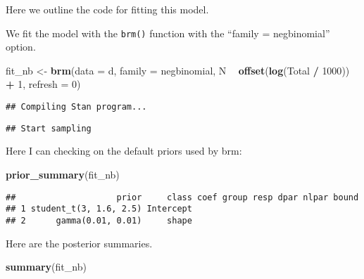 \documentclass[
]{book}
\newenvironment{Shaded}{\begin{snugshade}}{\end{snugshade}}
\newcommand{\DataTypeTok}[1]{\textcolor[rgb]{0.13,0.29,0.53}{#1}}
\newcommand{\DecValTok}[1]{\textcolor[rgb]{0.00,0.00,0.81}{#1}}
\newcommand{\KeywordTok}[1]{\textcolor[rgb]{0.13,0.29,0.53}{\textbf{#1}}}
\newcommand{\NormalTok}[1]{#1}
\newcommand{\OperatorTok}[1]{\textcolor[rgb]{0.81,0.36,0.00}{\textbf{#1}}}
\newcommand{\StringTok}[1]{\textcolor[rgb]{0.31,0.60,0.02}{#1}}
\begin{document}
Here we outline the code for fitting this model.

We fit the model with the \texttt{brm()} function with the ``family = negbinomial'' option.

\begin{Shaded}
\begin{Highlighting}[]
\NormalTok{fit_nb <-}\StringTok{ }\KeywordTok{brm}\NormalTok{(}\DataTypeTok{data =}\NormalTok{ d, }\DataTypeTok{family =}\NormalTok{ negbinomial,}
\NormalTok{           N }\OperatorTok{~}\StringTok{ }\KeywordTok{offset}\NormalTok{(}\KeywordTok{log}\NormalTok{(Total }\OperatorTok{/}\StringTok{ }\DecValTok{1000}\NormalTok{)) }\OperatorTok{+}\StringTok{ }\DecValTok{1}\NormalTok{,}
           \DataTypeTok{refresh =} \DecValTok{0}\NormalTok{)}
\end{Highlighting}
\end{Shaded}

\begin{verbatim}
## Compiling Stan program...
\end{verbatim}

\begin{verbatim}
## Start sampling
\end{verbatim}

Here I can checking on the default priors used by brm:

\begin{Shaded}
\begin{Highlighting}[]
\KeywordTok{prior_summary}\NormalTok{(fit_nb)}
\end{Highlighting}
\end{Shaded}

\begin{verbatim}
##                    prior     class coef group resp dpar nlpar bound
## 1 student_t(3, 1.6, 2.5) Intercept                                 
## 2      gamma(0.01, 0.01)     shape
\end{verbatim}

Here are the posterior summaries.

\begin{Shaded}
\begin{Highlighting}[]
\KeywordTok{summary}\NormalTok{(fit_nb)}
\end{Highlighting}
\end{Shaded}
\end{document}
